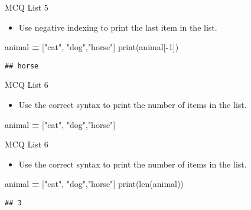 \documentclass[
  8pt,
  ignorenonframetext,
]{beamer}
\newenvironment{Shaded}{\begin{snugshade}}{\end{snugshade}}
\newcommand{\BuiltInTok}[1]{#1}
\newcommand{\DecValTok}[1]{\textcolor[rgb]{0.00,0.00,0.81}{#1}}
\newcommand{\NormalTok}[1]{#1}
\newcommand{\OperatorTok}[1]{\textcolor[rgb]{0.81,0.36,0.00}{\textbf{#1}}}
\newcommand{\StringTok}[1]{\textcolor[rgb]{0.31,0.60,0.02}{#1}}
\providecommand{\tightlist}{%
  \setlength{\itemsep}{0pt}\setlength{\parskip}{0pt}}
\begin{document}
\begin{frame}[fragile]{MCQ List 5}
\protect\hypertarget{mcq-list-5-1}{}
\begin{itemize}
\tightlist
\item
  Use negative indexing to print the last item in the list.
\end{itemize}

\begin{Shaded}
\begin{Highlighting}[]
\NormalTok{animal }\OperatorTok{=}\NormalTok{ [}\StringTok{"cat"}\NormalTok{, }\StringTok{"dog"}\NormalTok{,}\StringTok{"horse"}\NormalTok{]}
\BuiltInTok{print}\NormalTok{(animal[}\OperatorTok{{-}}\DecValTok{1}\NormalTok{])}
\end{Highlighting}
\end{Shaded}

\begin{verbatim}
## horse
\end{verbatim}
\end{frame}

\begin{frame}[fragile]{MCQ List 6}
\protect\hypertarget{mcq-list-6}{}
\begin{itemize}
\tightlist
\item
  Use the correct syntax to print the number of items in the list.
\end{itemize}

\begin{Shaded}
\begin{Highlighting}[]
\NormalTok{animal }\OperatorTok{=}\NormalTok{ [}\StringTok{"cat"}\NormalTok{, }\StringTok{"dog"}\NormalTok{,}\StringTok{"horse"}\NormalTok{]}
\end{Highlighting}
\end{Shaded}
\end{frame}

\begin{frame}[fragile]{MCQ List 6}
\protect\hypertarget{mcq-list-6-1}{}
\begin{itemize}
\tightlist
\item
  Use the correct syntax to print the number of items in the list.
\end{itemize}

\begin{Shaded}
\begin{Highlighting}[]
\NormalTok{animal }\OperatorTok{=}\NormalTok{ [}\StringTok{"cat"}\NormalTok{, }\StringTok{"dog"}\NormalTok{,}\StringTok{"horse"}\NormalTok{]}
\BuiltInTok{print}\NormalTok{(}\BuiltInTok{len}\NormalTok{(animal))}
\end{Highlighting}
\end{Shaded}

\begin{verbatim}
## 3
\end{verbatim}
\end{frame}
\end{document}
